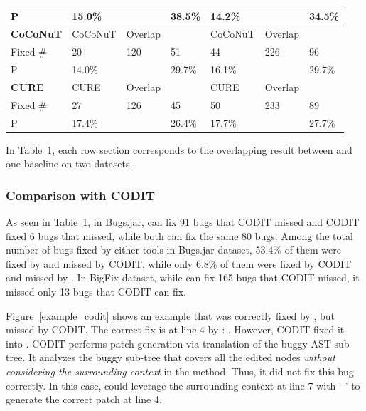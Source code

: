 {{\begin{table}[t]
\begin{center}
\begin{tabular}{p{1cm}<{\centering}|p{1.1cm}<{\centering}|p{0.8cm}<{\centering}|p{0.7cm}<{\centering}|p{1.1cm}<{\centering}|p{0.8cm}<{\centering}|p{0.7cm}<{\centering}}
			P            &  15.0\%  &    & 38.5\%  &  14.2\%  &    &  34.5\%\\
			\hline
			{\bf CoCoNuT}             & CoCoNuT   & Overlap   & \tool  & CoCoNuT   & Overlap   & \tool \\
			\hline
			Fixed \#     & \cellcolor{mygray} 20  & 120   & \cellcolor{mygray} 51 & \cellcolor{mygray}44 &  226  & \cellcolor{mygray} 96\\
			P            &  14.0\%  &    &  29.7\% &  16.1\%  &    & 29.7\% \\
			\hline
			{\bf CURE}             & CURE   & Overlap   & \tool  & CURE   & Overlap   & \tool \\
			\hline
			Fixed \#     & \cellcolor{mygray} 27  &  126  & \cellcolor{mygray} 45 & \cellcolor{mygray} 50&  233  & \cellcolor{mygray} 89\\
			P            &  17.4\%  &    & 26.4\%  & 17.7\%   &    &  27.7\%\\
			\hline
		\end{tabular}
		\label{RQ3_results}
	\end{center}
\end{table}
}}

In Table~\ref{RQ3_results}, each row section corresponds to the
overlapping result between {\tool} and one baseline on two datasets.

\subsubsection{{\bf Comparison with CODIT}}

As seen in Table~\ref{RQ3_results}, in Bugs.jar, {\tool} can fix 91
bugs that CODIT missed and CODIT fixed 6 bugs that {\tool} missed,
while both can fix the same 80 bugs. Among the total number of bugs
fixed by either tools in Bugs.jar dataset, 53.4\% of them were fixed by
{\tool} and missed by CODIT, while only 6.8\% of them were fixed by
CODIT and missed by {\tool}. In BigFix dataset, while {\tool} can fix
165 bugs that CODIT missed, it missed only 13 bugs that CODIT can fix.



Figure~\ref{example_codit} shows an example that was correctly fixed
by {\tool}, but missed by CODIT. The correct fix is at line 4 by
{\tool}:    
.  However, CODIT fixed it into 
 . CODIT performs patch generation via
translation of the buggy AST sub-tree. It analyzes the buggy sub-tree
that covers all the edited nodes {\em without considering the
  surrounding context} in the method.  Thus, it did not fix this bug
correctly. In this case, {\tool} could leverage the surrounding
context at line 7 with ` 
' to generate the correct patch at line 4.


